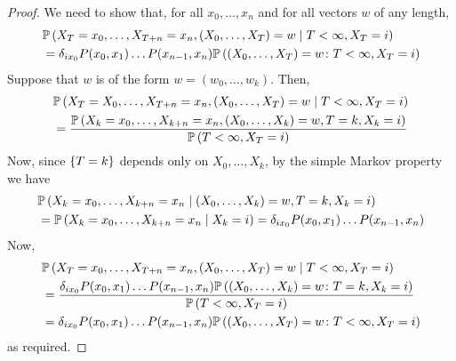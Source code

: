 \begin{proof}
	We need to show that, for all \( x_0, \dots, x_n \) and for all vectors \( w \) of any length,
	\begin{align*}
		&\mathbb{P}\left({X_T = x_0, \dots, X_{T+n} = x_n, (X_0, \dots, X_T) = w \mid T < \infty, X_T = i}\right) \\
		&= \delta_{i x_0} P(x_0,x_1) \dots P(x_{n-1}, x_n) \mathbb{P}\left({(X_0, \dots, X_T) = w \colon T < \infty, X_T = i}\right)
	\end{align*}
	Suppose that \( w \) is of the form \( w = (w_0, \dots, w_k) \).
	Then,
	\begin{align*}
		&\mathbb{P}\left({X_T = X_0, \dots, X_{T+n} = x_n, (X_0, \dots, X_T) = w \mid T < \infty, X_T = i}\right) \\
		&= \frac{\mathbb{P}\left({X_k = x_0, \dots, X_{k+n} = x_n, (X_0, \dots, X_k)=w, T=k,X_k=i}\right)}{\mathbb{P}\left({T < \infty, X_T = i}\right)}
	\end{align*}
	Now, since \( \qty{T=k} \) depends only on \( X_0, \dots, X_k \), by the simple Markov property we have
	\begin{align*}
		&\mathbb{P}\left({X_k = x_0, \dots, X_{k+n} = x_n \mid (X_0, \dots, X_k) = w, T = k, X_k = i}\right) \\
		&= \mathbb{P}\left({X_k = x_0, \dots, X_{k+n} = x_n \mid X_k = i}\right) = \delta_{i x_0} P(x_0, x_1) \dots P(x_{n-1}, x_n)
	\end{align*}
	Now,
	\begin{align*}
		& \mathbb{P}\left({X_T = x_0, \dots, X_{T+n} = x_n, (X_0, \dots, X_T) = w \mid T < \infty, X_T = i}\right) \\
		&= \frac{\delta_{i x_0} P(x_0,x_1) \dots P(x_{n-1}, x_n) \mathbb{P}\left({(X_0, \dots, X_k) = w \colon T = k, X_k = i}\right)}{\mathbb{P}\left({T < \infty, X_T = i}\right)} \\
		 & = \delta_{i x_0} P(x_0,x_1) \dots P(x_{n-1}, x_n) \mathbb{P}\left({(X_0, \dots, X_T) = w \colon T < \infty, X_T = i}\right)
	\end{align*}
	as required.
\end{proof}
